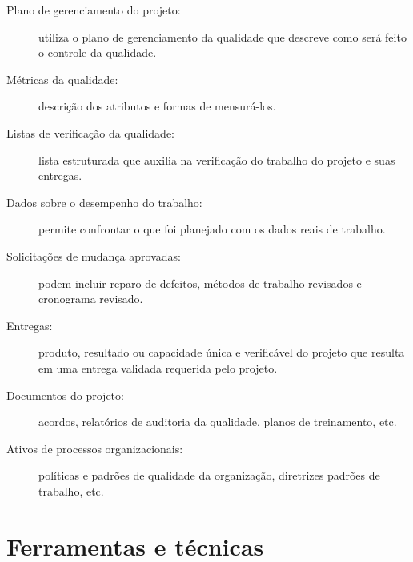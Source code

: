 \begin{description}

	\item[Plano de gerenciamento do projeto:] utiliza o plano de gerenciamento da qualidade que descreve como será feito o controle da qualidade.
	
	\item[Métricas da qualidade:] descrição dos atributos e formas de mensurá-los.
	
	\item[Listas de verificação da qualidade:] lista estruturada que auxilia na verificação do trabalho do projeto e suas entregas.
	
	\item[Dados sobre o desempenho do trabalho:] permite confrontar o que foi planejado com os dados reais de trabalho.
	
	\item[Solicitações de mudança aprovadas:] podem incluir reparo de defeitos, métodos de trabalho revisados e cronograma revisado.
	
	\item[Entregas:] produto, resultado ou capacidade única e verificável do projeto que resulta em uma entrega validada requerida pelo projeto.
	
	\item[Documentos do projeto:] acordos, relatórios de auditoria da qualidade, planos de treinamento, etc.
	
	\item[Ativos de processos organizacionais:] políticas e padrões de qualidade da organização, diretrizes padrões de trabalho, etc.
	
\end{description}

\section{Ferramentas e técnicas}

